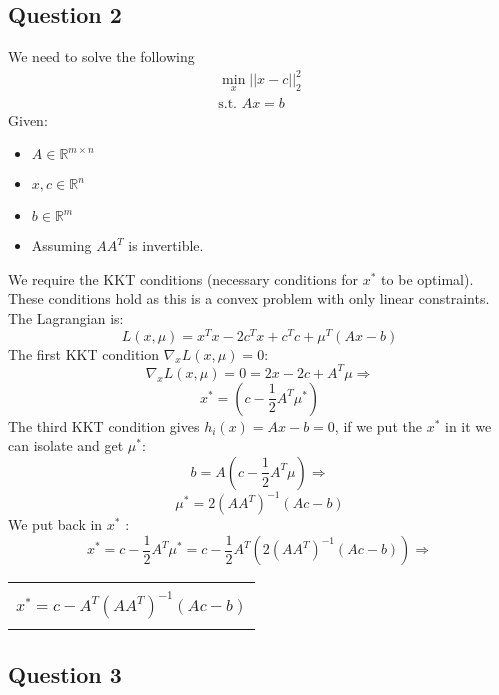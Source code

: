 \documentclass[12pt]{article}
\newcommand{\rectres}[1]{
\begin{center}
\begin{tabular}{ |c| }
\hline
\\
 #1\\
 \\
\hline
\end{tabular}
\end{center}
}
\begin{document}
\subsection{Question 2}

We need to solve the following 
\begin{equation}
\label{eq:min2}
\begin{split}
    \min _x ||x - c||^2_2 \\
    \text{s.t. } Ax = b
\end{split}
\end{equation}
Given:
\begin{itemize}
  \item $A \in \mathbb{R}^{m\times n}$
  \item $x,c \in \mathbb{R}^{n}$
  \item $b \in \mathbb{R}^{m}$
  \item Assuming $AA^T$ is invertible.
\end{itemize}

We require the KKT conditions (necessary conditions for $x^*$ to be optimal).\\
These conditions hold as this is a convex problem with only linear constraints.
The Lagrangian is:
$$L(x,\mu)=x^Tx -2c^T x + c^Tc + \mu^T(Ax-b)$$
The first KKT condition $\nabla_x L(x,\mu)=0$:
$$\nabla_x L(x,\mu)= 0 = 2x -2c + A^T\mu \Rightarrow$$
$$x^* = (c - \frac{1}{2} A^T\mu^*)$$
The third KKT condition gives $h_i(x)=Ax-b=0$, if we put the $x^*$ in it we can isolate and get $\mu^*$:\\
$$b = A(c - \frac{1}{2} A^T\mu) \Rightarrow$$
$$\mu^* = 2(AA^T)^{-1}(Ac-b)$$
We put back in $x^*$ :\\
$$x^* = c - \frac{1}{2} A^T\mu^* = c - \frac{1}{2} A^T (2(AA^T)^{-1}(Ac-b))  \Rightarrow  $$
\rectres{$$x^* =   c - A^T(AA^T)^{-1}(Ac-b)$$}

\newpage

\subsection{Question 3}
\end{document}
